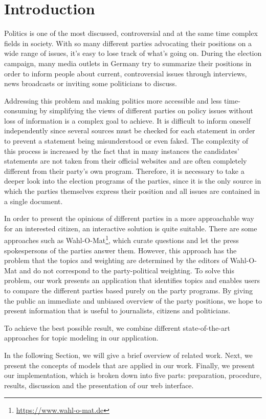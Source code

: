 \section{Introduction}

Politics is one of the most discussed, controversial and at the same time complex fields in society.
With so many different parties advocating their positions on a wide range of issues, it's easy to lose track of what's going on. During the election campaign, many media outlets in Germany try to summarize their positions in order to inform people about current, controversial issues through interviews, news broadcasts or inviting some politicians to discuss.

Addressing this problem and making politics more accessible and less time-consuming by simplifying the views of different parties on policy issues without loss of information is a complex goal to achieve. It is difficult to inform oneself independently since several sources must be checked for each statement in order to prevent a statement being misunderstood or even faked. The complexity of this process is increased by the fact that in many instances the candidates' statements are not taken from their official websites and are often completely different from their party's own program.   Therefore, it is necessary to take a deeper look into the election programs of the parties, since it is the only source in which the parties themselves express their position and all issues are contained in a single document. 

In order to present the opinions of different parties in a more approachable way for an interested citizen, an interactive solution is quite suitable. There are some approaches such as Wahl-O-Mat\footnote{\url{https://www.wahl-o-mat.de}}, which curate questions and let the press spokespersons of the parties answer them. However, this approach has the problem that the topics and weighting are determined by the editors of Wahl-O-Mat and do not correspond to the party-political weighting. To solve this problem, our work presents an application that identifies topics and enables users to compare the different parties based purely on the party programs. By giving the public an immediate and unbiased overview of the party positions, we hope to present information that is useful to journalists, citizens and politicians.

To achieve the best possible result, we combine different state-of-the-art approaches for topic modeling in our application. 

In the following Section, we will give a brief overview of related work. Next, we present the concepts of models that are applied in our work. Finally, we present our implementation, which is broken down into five parts: preparation, procedure, results, discussion and the presentation of our web interface. 


